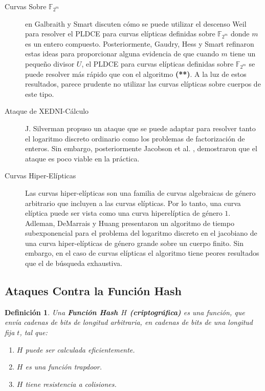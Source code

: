 \documentclass[11pt]{article}
\newcommand{\F}{\mathbb{F}}
\newcommand{\Fm}{\F_{2^m}}
\numberwithin{equation}{section} %
\numberwithin{figure}{section} %
\numberwithin{table}{section} %
\newtheorem{defi}{{\bf Definición }}[subsection]
\begin{document}
\begin{description}
			\item[Curvas Sobre $\Fm$] en \cite{GS99} Galbraith y Smart discuten cómo se puede utilizar el descenso Weil para resolver el PLDCE para curvas elípticas definidas sobre $\Fm$ donde $m$ es un entero compuesto. Posteriormente, Gaudry, Hess y Smart \cite{GHS} refinaron estas ideas para proporcionar alguna evidencia de que cuando $m$ tiene un pequeño divisor $U$, el PLDCE para curvas elípticas definidas sobre $\Fm$ se puede resolver más rápido que con el algoritmo \textbf{(**)}. A la luz de estos resultados, parece prudente no utilizar las curvas elípticas sobre cuerpos de este tipo.

			\item[Ataque de XEDNI-Cálculo] J. Silverman \cite{Sil00} propuso un ataque que se puede adaptar para resolver tanto el logaritmo discreto ordinario como los problemas de factorización de enteros. Sin embargo, posteriormente Jacobson et al. \cite{Jetal}, demostraron que el ataque es poco viable en la práctica.

			\item[Curvas Hiper-Elípticas] Las curvas hiper-elípticas son una familia de curvas algebraicas de género arbitrario que incluyen a las curvas elípticas. Por lo tanto, una curva elíptica puede ser vista como una curva hiperelíptica de género $1$. Adleman, DeMarrais y Huang \cite{ADH} presentaron un algoritmo de tiempo subexponencial para el problema del logaritmo discreto en el jacobiano de una curva hiper-elípticas de género grande sobre un cuerpo finito. Sin embargo, en el caso de curvas elípticas el algoritmo tiene peores resultados que el de búsqueda exhaustiva.
   
\end{description}

	\subsection{Ataques Contra la Función Hash}

		\begin{defi}
			Una \textbf{Función Hash $H$ (criptográfica)} es una función, que envía cadenas de bits de longitud arbitraria, en cadenas de bits de una longitud fija $t$, tal que:
			\begin{enumerate}
				\item $H$ puede ser calculada eficientemente.
				\item $H$ es una función trapdoor.\label{hashtrap}
				\item $H$ tiene resistencia a colisiones.\label{hashcol}
			\end{enumerate}
		\end{defi}
\end{document}
